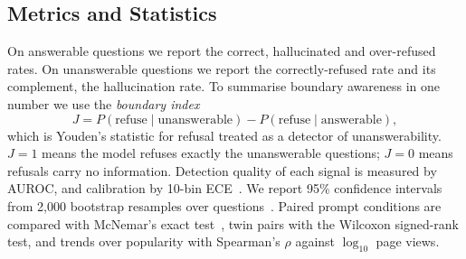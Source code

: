 \subsection{Metrics and Statistics}
On answerable questions we report the correct, hallucinated and over-refused rates. On unanswerable questions we report the correctly-refused rate and its complement, the hallucination rate. To summarise boundary awareness in one number we use the \emph{boundary index}
\begin{equation}
J = P(\text{refuse}\mid\text{unanswerable}) - P(\text{refuse}\mid\text{answerable}),
\end{equation}
which is Youden's statistic for refusal treated as a detector of unanswerability. $J{=}1$ means the model refuses exactly the unanswerable questions; $J{=}0$ means refusals carry no information. Detection quality of each signal is measured by AUROC, and calibration by 10-bin ECE~\cite{naeini2015ece}. We report 95\% confidence intervals from 2{,}000 bootstrap resamples over questions~\cite{efron1993bootstrap}. Paired prompt conditions are compared with McNemar's exact test~\cite{mcnemar1947}, twin pairs with the Wilcoxon signed-rank test, and trends over popularity with Spearman's $\rho$ against $\log_{10}$ page views.
